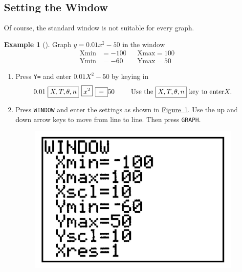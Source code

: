 \documentclass[10pt,]{book}
\theoremstyle{plain}
\theoremstyle{definition}
\theoremstyle{definition}
\newtheorem{example}[theorem]{Example}
\theoremstyle{definition}
\numberwithin{equation}{part}
\newcommand{\amp}{&}
\begin{document}
\subsection[{Setting the Window}]{Setting the Window}\label{subsection-79}
Of course, the standard window is not suitable for every graph.%
\begin{example}[]\label{example-117}
Graph \(y= 0.01x^2- 50\) in the window%
\begin{align*}
\text{Xmin} \amp = -100 \amp\amp \text{Xmax} = 100
\\
\text{Ymin} \amp = -60 \amp\amp \text{Ymax} = 50
\end{align*}
\leavevmode%
\begin{enumerate}[label=*\arabic**]
\item\hypertarget{li-415}{}Press \lstinline?Y=? and enter \(0.01X^2-50\) by keying in%
\begin{equation*}
0.01 ~ \boxed{X,T,\theta,n}~\boxed{x^2}~\boxed{{}-{}} 50 \hphantom{blank} \text{Use the }  \boxed{X,T,\theta,n}\text{ key to enter} X.
\end{equation*}
%
\item\hypertarget{li-416}{}Press \lstinline?WINDOW? and enter the settings as shown in \hyperref[fig-GC-window-settings]{Figure~\ref{fig-GC-window-settings}}. Use the up and down arrow keys to move from line to line. Then press \lstinline?GRAPH?. \leavevmode%
\begin{figure}
\centering
\includegraphics[width=0.3\linewidth]{images/fig-GC-window-settings.jpg}
\caption{\label{fig-GC-window-settings}}
\end{figure}
%
\end{enumerate}
%
\end{example}
\typeout{************************************************}
\typeout{************************************************}
\end{document}

